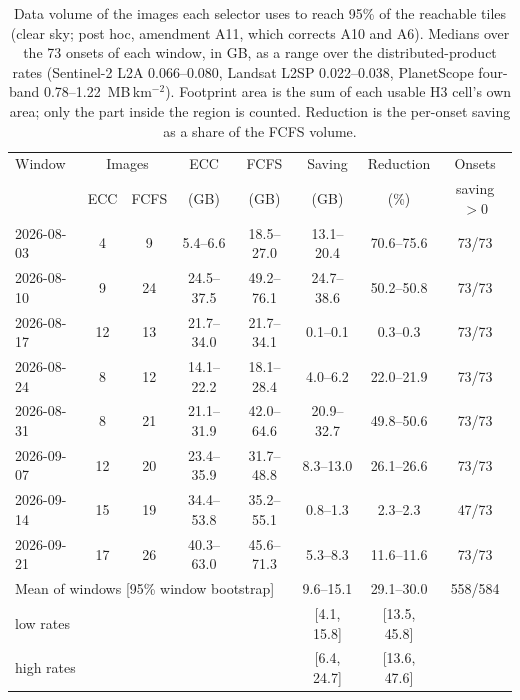 \begin{table}[!t]
\centering
\footnotesize
\renewcommand{\arraystretch}{1.2}
\setlength{\tabcolsep}{4pt}
\caption{Data volume of the images each selector uses to reach 95\% of the reachable tiles (clear sky; post hoc, amendment A11, which corrects A10 and A6). Medians over the 73 onsets of each window, in GB, as a range over the distributed-product rates (Sentinel-2 L2A 0.066--0.080, Landsat L2SP 0.022--0.038, PlanetScope four-band 0.78--1.22~MB\,km$^{-2}$). Footprint area is the sum of each usable H3 cell's own area; only the part inside the region is counted. Reduction is the per-onset saving as a share of the FCFS volume.}
\label{tab:a11_volume}
\begin{tabular}{|l|c|c|c|c|c|c|c|}
\hline
Window & \multicolumn{2}{c|}{Images} & ECC & FCFS & Saving & Reduction & Onsets \\
 & ECC & FCFS & (GB) & (GB) & (GB) & (\%) & saving $>0$ \\
\hline
2026-08-03 & 4 & 9 & 5.4--6.6 & 18.5--27.0 & 13.1--20.4 & 70.6--75.6 & 73/73 \\
\hline
2026-08-10 & 9 & 24 & 24.5--37.5 & 49.2--76.1 & 24.7--38.6 & 50.2--50.8 & 73/73 \\
\hline
2026-08-17 & 12 & 13 & 21.7--34.0 & 21.7--34.1 & 0.1--0.1 & 0.3--0.3 & 73/73 \\
\hline
2026-08-24 & 8 & 12 & 14.1--22.2 & 18.1--28.4 & 4.0--6.2 & 22.0--21.9 & 73/73 \\
\hline
2026-08-31 & 8 & 21 & 21.1--31.9 & 42.0--64.6 & 20.9--32.7 & 49.8--50.6 & 73/73 \\
\hline
2026-09-07 & 12 & 20 & 23.4--35.9 & 31.7--48.8 & 8.3--13.0 & 26.1--26.6 & 73/73 \\
\hline
2026-09-14 & 15 & 19 & 34.4--53.8 & 35.2--55.1 & 0.8--1.3 & 2.3--2.3 & 47/73 \\
\hline
2026-09-21 & 17 & 26 & 40.3--63.0 & 45.6--71.3 & 5.3--8.3 & 11.6--11.6 & 73/73 \\
\hline
\multicolumn{5}{|l|}{Mean of windows [95\% window bootstrap]} & 9.6--15.1 & 29.1--30.0 & 558/584 \\
\hline
\multicolumn{5}{|l|}{\quad low rates} & [4.1, 15.8] & [13.5, 45.8] & \\
\hline
\multicolumn{5}{|l|}{\quad high rates} & [6.4, 24.7] & [13.6, 47.6] & \\
\hline
\end{tabular}
\end{table}
